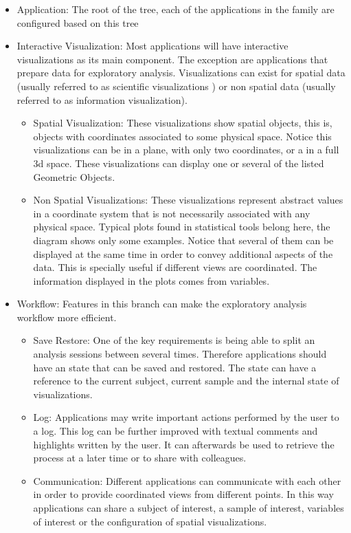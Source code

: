 \begin{itemize}
\item Application: The root of the tree, each of the applications in the family are configured based on this tree
\item Interactive Visualization: Most applications will have interactive visualizations as its main component. The exception are applications that prepare data for exploratory analysis. Visualizations can exist for spatial data (usually referred to as scientific visualizations ) or non spatial data (usually referred to as information visualization).
\begin{itemize}
\item Spatial Visualization: These visualizations show spatial objects, this is, objects with coordinates associated to some physical space. Notice this visualizations can be in a plane, with only two coordinates, or a in a full 3d space. These visualizations can display one or several of the listed Geometric Objects.
\item Non Spatial Visualizations: These visualizations represent abstract values in a coordinate system that is not necessarily associated with any physical space. Typical plots found in statistical tools belong here, the diagram shows only some examples. Notice that several of them can be displayed at the same time in order to convey additional aspects of the data. This is specially useful if different views are coordinated. The information displayed in the plots comes from variables. 
\end{itemize}
\item Workflow: Features in this branch can make the exploratory analysis workflow more efficient. 
\begin{itemize}
\item Save Restore: One of the key requirements is being able to split an analysis sessions between several times. Therefore applications should have an state that can be saved and restored. The state can have a reference to the current subject, current sample and the internal state of visualizations. 
\item Log: Applications may write important actions performed by the user to a log. This log can be further improved with textual comments and highlights written by the user. It can afterwards be used to retrieve the process at a later time or to share with colleagues.
\item Communication: Different applications can communicate with each other in order to provide coordinated views from different points. In this way applications can share a subject of interest, a sample of interest, variables of interest or the configuration of spatial visualizations.

\end{itemize}
\end{itemize}
